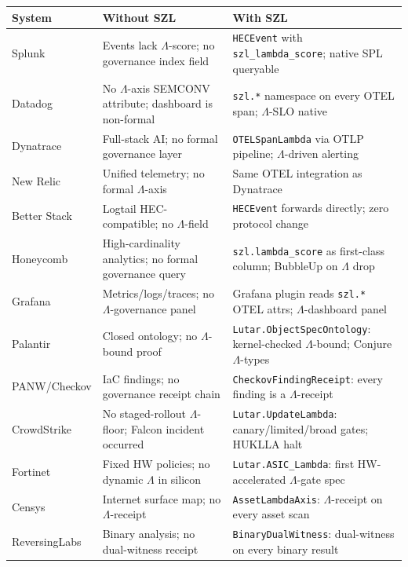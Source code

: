 \begin{table}[ht]
\centering
\small
\begin{tabular}{p{2.2cm}|p{4.5cm}|p{4.5cm}}
\textbf{System} & \textbf{Without SZL} & \textbf{With SZL} \\
\hline
Splunk & Events lack $\Lambda$-score; no governance index field & \texttt{HECEvent} with \texttt{szl\_lambda\_score}; native SPL queryable \\
\hline
Datadog & No $\Lambda$-axis SEMCONV attribute; dashboard is non-formal & \texttt{szl.*} namespace on every OTEL span; $\Lambda$-SLO native \\
\hline
Dynatrace & Full-stack AI; no formal governance layer & \texttt{OTELSpanLambda} via OTLP pipeline; $\Lambda$-driven alerting \\
\hline
New Relic & Unified telemetry; no formal $\Lambda$-axis & Same OTEL integration as Dynatrace \\
\hline
Better Stack & Logtail HEC-compatible; no $\Lambda$-field & \texttt{HECEvent} forwards directly; zero protocol change \\
\hline
Honeycomb & High-cardinality analytics; no formal governance query & \texttt{szl.lambda\_score} as first-class column; BubbleUp on $\Lambda$ drop \\
\hline
Grafana & Metrics/logs/traces; no $\Lambda$-governance panel & Grafana plugin reads \texttt{szl.*} OTEL attrs; $\Lambda$-dashboard panel \\
\hline
Palantir & Closed ontology; no $\Lambda$-bound proof & \texttt{Lutar.ObjectSpecOntology}: kernel-checked $\Lambda$-bound; Conjure $\Lambda$-types \\
\hline
PANW/Checkov & IaC findings; no governance receipt chain & \texttt{CheckovFindingReceipt}: every finding is a $\Lambda$-receipt \\
\hline
CrowdStrike & No staged-rollout $\Lambda$-floor; Falcon incident occurred & \texttt{Lutar.UpdateLambda}: canary/limited/broad gates; HUKLLA halt \\
\hline
Fortinet & Fixed HW policies; no dynamic $\Lambda$ in silicon & \texttt{Lutar.ASIC\_Lambda}: first HW-accelerated $\Lambda$-gate spec \\
\hline
Censys & Internet surface map; no $\Lambda$-receipt & \texttt{AssetLambdaAxis}: $\Lambda$-receipt on every asset scan \\
\hline
ReversingLabs & Binary analysis; no dual-witness receipt & \texttt{BinaryDualWitness}: dual-witness on every binary result \\

\end{tabular}
\end{table}

